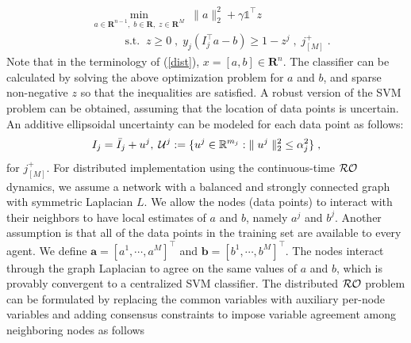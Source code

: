 \documentclass[journal,twoside,web]{ieeecolor}
\begin{document}
\begin{align} \label{ro_svm}
&\min_{a \in \mathbf{R}^{n-1},\;b \in \mathbf{R},\;z \in \mathbf{R}^{M}} \;\parallel a \parallel_2^2+\gamma \mathds{1}^\top z\\
&\;\;\;\;\;\;\;\;\;\;\;\text{s.t.}\;\;z \geq 0\;,\; y_j(I_j^\top a-b) \geq 1-z^j\;,\; j^+_{[M]}\nonumber\;.
\nonumber\end{align}
Note that in the terminology of (\ref{dist}), $x=[a,b] \in \mathbf{R}^n$. The classifier can be calculated by solving the above optimization problem for $a$ and $b$, and sparse non-negative $z$ so that the inequalities are satisfied. A robust version of the SVM problem can be obtained, assuming that the location of data points is uncertain. An additive ellipsoidal uncertainty can be modeled for each data point as follows:
\begin{align*}
I_j=\bar I_j+u^j,\; {\cal U}^j:=\{u^j \in \mathbb{R}^{m_j}:\;\parallel u^j \parallel_2^2 \; \leq \alpha_j^2\}\;,
\end{align*}
for $j^+_{[M]}$. 
For distributed implementation using the continuous-time ${\cal RO}$ dynamics, we assume a network with a balanced and strongly connected graph with symmetric Laplacian ${L}$. We allow the nodes (data points) to interact with their neighbors to have local estimates of $a$ and $b$, namely $a^j$ and $b^j$. Another assumption is that all of the data points in the training set are available to every agent. We define $\mathbf{a}=[a^1,\cdots,a^M]^\top$ and $\mathbf{b}=[b^1,\cdots,b^M]^\top$. The nodes interact through the graph Laplacian to agree on the same values of $a$ and $b$, which is provably convergent to a centralized SVM classifier. The distributed ${\cal RO}$ problem can be formulated by replacing the common variables with auxiliary per-node variables and adding consensus constraints to impose variable agreement among neighboring nodes as follows
\end{document}
